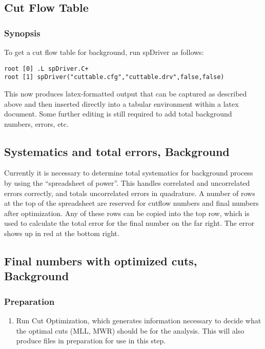 \documentclass[english]{article}
\begin{document}
\subsection{Cut Flow Table}

\subsubsection{Synopsis}
%
To get a cut flow table for background, run spDriver as follows:
%
\begin{lstlisting}
root [0] .L spDriver.C+
root [1] spDriver("cuttable.cfg","cuttable.drv",false,false)
\end{lstlisting}

This now produces latex-formatted output that can be captured as
described above and then inserted directly into a tabular environment
within a latex document. Some further editing is still required to
add total background numbers, errors, etc.

\subsection{Systematics and total errors, Background}

Currently it is necessary to determine total systematics
for background process by using the ``spreadsheet of power''.
This handles correlated and uncorrelated errors correctly,
and totals uncorrelated errors in quadrature. A number of
rows at the top of the spreadsheet are reserved for cutflow
numbers and final numbers after optimization. Any of these
rows can be copied into the top row, which is used to calculate
the total error for the final number on the far right. The
error shows up in red at the bottom right.

\subsection{Final numbers with optimized cuts, Background}

\subsubsection{Preparation}
%
\begin{enumerate}
\item Run Cut Optimization, which generates information necessary to
decide what the optimal cuts (MLL, MWR) should be for the analysis.
This will also produce files in preparation for use in this step.
\end{enumerate}
\end{document}
